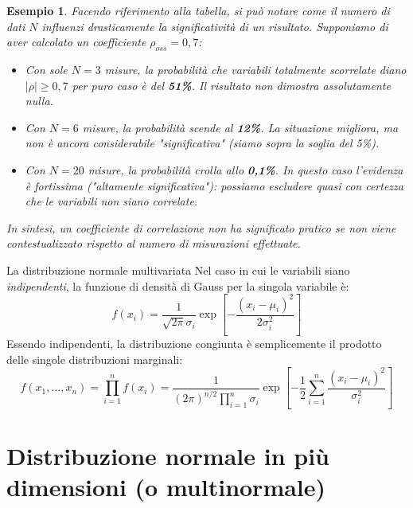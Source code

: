 \documentclass[openany,a4paper,12pt]{book}
\newtheorem*{example}{Esempio}
\theoremstyle{remark}
\begin{document}
\begin{example}
Facendo riferimento alla tabella, si può notare come il numero di dati $N$ influenzi drasticamente la significatività di un risultato. Supponiamo di aver calcolato un coefficiente $\rho_{oss} = 0,7$:
\begin{itemize}
    \item Con sole \textbf{$N=3$} misure, la probabilità che variabili totalmente scorrelate diano $|\rho| \ge 0,7$ per puro caso è del \textbf{51\%}. Il risultato non dimostra assolutamente nulla.
    \item Con \textbf{$N=6$} misure, la probabilità scende al \textbf{12\%}. La situazione migliora, ma non è ancora considerabile "significativa" (siamo sopra la soglia del 5\%).
    \item Con \textbf{$N=20$} misure, la probabilità crolla allo \textbf{0,1\%}. In questo caso l'evidenza è fortissima ("altamente significativa"): possiamo escludere quasi con certezza che le variabili non siano correlate.
\end{itemize}
In sintesi, un coefficiente di correlazione non ha significato pratico se non viene contestualizzato rispetto al numero di misurazioni effettuate.
\end{example}

\begin{bressan}{La distribuzione normale multivariata}
Nel caso in cui le variabili siano \textit{indipendenti}, la funzione di densità di Gauss per la singola variabile è:
\begin{equation}
    f(x_i) = \frac{1}{\sqrt{2\pi}\sigma_i} \exp\left[-\frac{(x_i-\mu_i)^2}{2\sigma_i^2}\right]
\end{equation}
Essendo indipendenti, la distribuzione congiunta è semplicemente il prodotto delle singole distribuzioni marginali:
\begin{equation}
    f(x_1, \ldots, x_n) = \prod_{i=1}^n f(x_i) = \frac{1}{(2\pi)^{n/2} \prod_{i=1}^n \sigma_i} \exp\left[ -\frac{1}{2} \sum_{i=1}^{n} \frac{(x_i-\mu_i)^2}{\sigma_i^2} \right]
\end{equation}
\end{bressan}


\section{Distribuzione normale in più dimensioni (o multinormale)}
\end{document}
